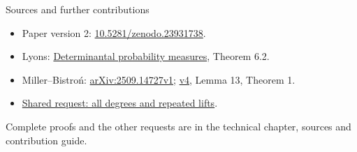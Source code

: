 \documentclass{beamer}
\begin{document}
\begin{frame}{Sources and further contributions}
\footnotesize
\begin{itemize}
\item Paper version 2: \href{https://doi.org/10.5281/zenodo.23931738}{10.5281/zenodo.23931738}.
\item Lyons: \href{https://doi.org/10.1007/s10240-003-0016-0}{Determinantal probability measures}, Theorem 6.2.
\item Miller--Bistroń: \href{https://arxiv.org/abs/2509.14727v1}{arXiv:2509.14727v1}; \href{https://arxiv.org/abs/2509.14727v4}{v4}, Lemma 13, Theorem 1.
\item \href{https://github.com/the-omega-institute/trureturing-requests/issues/121}{Shared request: all degrees and repeated lifts}.
\end{itemize}
\normalsize Complete proofs and the other requests are in the technical chapter, sources and contribution guide.
\end{frame}
\FormalVerification
\end{document}
